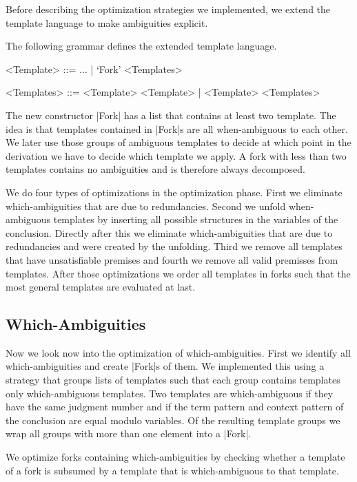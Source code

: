 Before describing the optimization strategies we implemented, we
extend the template language to make ambiguities explicit.

\begin{definition}
    The following grammar defines the extended template language.
    \begin{grammar}
    <Template> ::= $\dots$ | `Fork' <Templates>

    <Templates> ::= <Template> <Template> | <Template> <Templates>
    \end{grammar}
\end{definition}

The new constructor \code|Fork| has a list that contains at least two
template. The idea is that templates contained in \code|Fork|s are all
when-ambiguous to each other. We later use those groups of ambiguous
templates to decide at which point in the derivation we have to decide
which template we apply. A fork with less than two templates contains
no ambiguities and is therefore always decomposed.

We do four types of optimizations in the optimization phase. First we
eliminate which-ambiguities that are due to redundancies. Second we
unfold when-ambiguous templates by inserting all possible structures
in the variables of the conclusion. Directly after this we eliminate
which-ambiguities that are due to redundancies and were created by the
unfolding. Third we remove all templates that have unsatisfiable
premises and fourth we remove all valid premisses from
templates. After those optimizations we order all templates in forks
such that the most general templates are evaluated at last.

\subsection{Which-Ambiguities}
Now we look now into the optimization of which-ambiguities. First we
identify all which-ambiguities and create \code|Fork|s of them. We
implemented this using a strategy that groups lists of templates such
that each group contains templates only which-ambiguous templates. Two
templates are which-ambiguous if they have the same judgment number
and if the term pattern and context pattern of the conclusion are
equal modulo variables. Of the resulting template groups we wrap all
groups with more than one element into a \code|Fork|.

We optimize forks containing which-ambiguities by checking whether a
template of a fork is subsumed by a template that is which-ambiguous
to that template.

